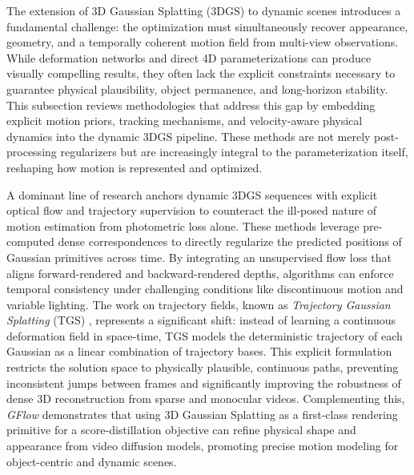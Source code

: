 \documentclass[11pt,a4paper]{article}
\begin{document}
\cite{arxiv:2405.03650v2}
The extension of 3D Gaussian Splatting (3DGS) to dynamic scenes introduces a fundamental challenge: the optimization must simultaneously recover appearance, geometry, and a temporally coherent motion field from multi-view observations. While deformation networks and direct 4D parameterizations can produce visually compelling results, they often lack the explicit constraints necessary to guarantee physical plausibility, object permanence, and long-horizon stability. This subsection reviews methodologies that address this gap by embedding explicit motion priors, tracking mechanisms, and velocity-aware physical dynamics into the dynamic 3DGS pipeline. These methods are not merely post-processing regularizers but are increasingly integral to the parameterization itself, reshaping how motion is represented and optimized.

A dominant line of research anchors dynamic 3DGS sequences with explicit optical flow and trajectory supervision to counteract the ill-posed nature of motion estimation from photometric loss alone. These methods leverage pre-computed dense correspondences to directly regularize the predicted positions of Gaussian primitives across time. By integrating an unsupervised flow loss that aligns forward-rendered and backward-rendered depths, algorithms \cite{arxiv:2602.03538v1,arxiv:2506.02751v3} can enforce temporal consistency under challenging conditions like discontinuous motion and variable lighting. The work on trajectory fields, known as \emph{Trajectory Gaussian Splatting} (TGS) \cite{arxiv:2511.14633v1}, represents a significant shift: instead of learning a continuous deformation field in space-time, TGS models the deterministic trajectory of each Gaussian as a linear combination of trajectory bases. This explicit formulation restricts the solution space to physically plausible, continuous paths, preventing inconsistent jumps between frames and significantly improving the robustness of dense 3D reconstruction from sparse and monocular videos. Complementing this, \emph{GFlow} \cite{arxiv:2605.11424v1} demonstrates that using 3D Gaussian Splatting as a first-class rendering primitive for a score-distillation objective can refine physical shape and appearance from video diffusion models, promoting precise motion modeling for object-centric and dynamic scenes.
\end{document}

